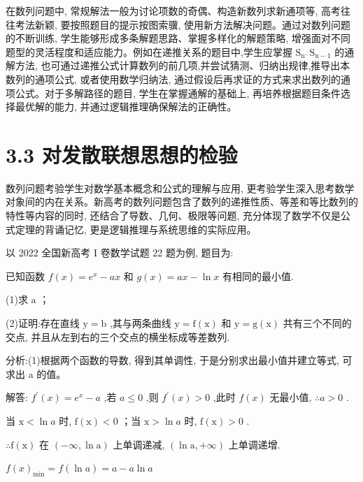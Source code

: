 \documentclass[10pt]{article}
\begin{document}
在数列问题中, 常规解法一般为讨论项数的奇偶、构造新数列求新通项等, 高考往往考法新颖, 要按照题目的提示按图索骥, 使用新方法解决问题。通过对数列问题的不断训练, 学生能够形成多条解题思路、掌握多样化的解题策略, 增强面对不同题型的灵活程度和适应能力。例如在递推关系的题目中,学生应掌握 \({\mathrm{S}}_{{\mathrm{n}}^{ - }}{\mathrm{S}}_{\mathrm{n} - 1}\) 的通解方法, 也可通过递推公式计算数列的前几项,并尝试猜测、归纳出规律,推导出本数列的通项公式, 或者使用数学归纳法, 通过假设后再求证的方式来求出数列的通项公式。对于多解路径的题目, 学生在掌握通解的基础上, 再培养根据题目条件选择最优解的能力, 并通过逻辑推理确保解法的正确性。

\section*{3.3 对发散联想思想的检验}

数列问题考验学生对数学基本概念和公式的理解与应用, 更考验学生深入思考数学对象间的内在关系。新高考的数列问题包含了数列的递推性质、等差和等比数列的特性等内容的同时, 还结合了导数、几何、极限等问题, 充分体现了数学不仅是公式定理的背诵记忆, 更是逻辑推理与系统思维的实际应用。

以 2022 全国新高考 I 卷数学试题 22 题为例, 题目为:

已知函数 \(f\left( x\right)  = {e}^{x} - {ax}\) 和 \(g\left( x\right)  = {ax} - \ln x\) 有相同的最小值.

(1)求 \(\mathrm{a}\) ；

(2)证明:存在直线 \(\mathrm{y} = \mathrm{b}\) ,其与两条曲线 \(\mathrm{y} = \mathrm{f}\left( \mathrm{x}\right)\) 和 \(\mathrm{y} = \mathrm{g}\left( \mathrm{x}\right)\) 共有三个不同的交点, 并且从左到右的三个交点的横坐标成等差数列.

分析:(1)根据两个函数的导数, 得到其单调性, 于是分别求出最小值并建立等式, 可求出 a 的值。

解答: \({f}^{\prime }\left( x\right)  = {e}^{x} - a\) ,若 \(a \leq  0\) ,则 \({f}^{\prime }\left( x\right)  > 0\) ,此时 \(f\left( x\right)\) 无最小值, \(\therefore a > 0\) .

当 \(\mathrm{x} < \ln a\) 时, \(\mathrm{f}\left( \mathrm{x}\right)  < 0\) ；当 \(\mathrm{x} > \ln a\) 时, \(\mathrm{f}\left( \mathrm{x}\right)  > 0\) .

\(\therefore \mathrm{f}\left( \mathrm{x}\right)\) 在 \(\left( {-\infty ,\ln \mathrm{a}}\right)\) 上单调递减, \(\left( {\ln \mathrm{a}, + \infty }\right)\) 上单调递增.

\(f{\left( x\right) }_{\min } = f\left( {\ln a}\right)  = a - a\ln a\)
\end{document}
